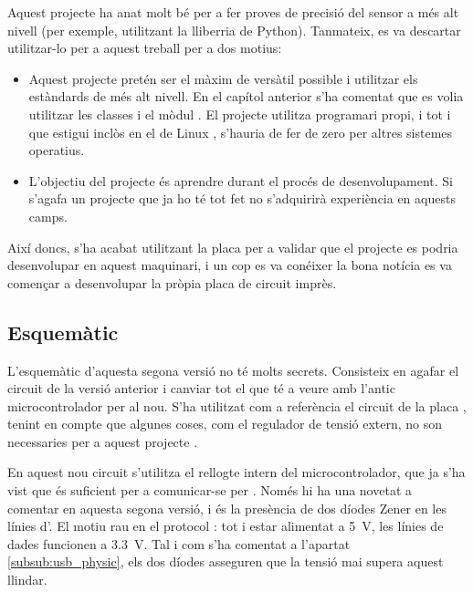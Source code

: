 Aquest projecte ha anat molt bé per a fer proves de precisió del sensor a més
alt nivell (per exemple, utilitzant la lliberria  de Python). Tanmateix,
es va descartar utilitzar-lo per a aquest treball per a dos motius:

\begin{itemize}
    \item Aquest projecte pretén ser el màxim de versàtil possible i utilitzar
    els estàndards de més alt nivell. En el capítol anterior s'ha comentat que
    es volia utilitzar les classes  i el mòdul . El projecte
     utilitza programari propi, i tot i que estigui inclòs
    en el  de Linux \cite{I2cTinyKernel}, s'hauria de fer de zero per altres sistemes
    operatius.
    \item L'objectiu del projecte és aprendre durant el procés de desenvolupament.
    Si s'agafa un projecte que ja ho té tot fet no s'adquirirà experiència en
    aquests camps.
\end{itemize}

Així doncs, s'ha acabat utilitzant la placa  per a validar
que el projecte es podria desenvolupar en aquest maquinari, i un cop es va
conéixer la bona notícia es va començar a desenvolupar la pròpia placa de circuit
imprès.

\subsection{Esquemàtic}

L'esquemàtic d'aquesta segona versió no té molts secrets. Consisteix en agafar
el circuit de la versió anterior i canviar tot el que té a veure amb l'antic
microcontrolador per al nou. S'ha utilitzat com a referència el circuit de la
placa , tenint en compte que algunes coses, com el regulador de
tensió extern, no son necessaries per a aquest projecte \cite{Digispark}.

En aquest nou circuit s'utilitza el rellogte intern del microcontrolador, que
ja s'ha vist que és suficient per a comunicar-se per . Només hi ha
una novetat a comentar en aquesta segona versió, i és la presència de dos
díodes Zener en les línies d'. El motiu rau en el protocol :
tot i estar alimentat a \SI[round-mode=places,round-precision=0]{5}{\volt},
les línies de dades funcionen a
\SI[round-mode=places,round-precision=1]{3.3}{\volt}. Tal i com
s'ha comentat a l'apartat \ref{subsub:usb_physic}, els dos díodes asseguren
que la tensió mai supera aquest llindar.

